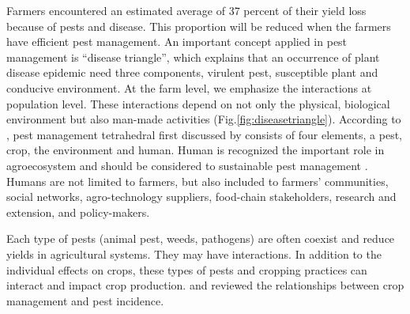 Farmers encountered an estimated average of 37 percent of their yield loss because of pests and disease. This proportion will be reduced when the farmers have efficient pest management. An important concept applied in pest management is ``disease triangle'', which explains that an occurrence of plant disease epidemic need three components, virulent pest, susceptible plant and conducive environment. At the farm level, we emphasize the interactions at population level. These interactions depend on not only the physical, biological environment but also man-made activities (Fig.\ref{fig:diseasetriangle}). According to \citet{Savary_2006_Quantification}, pest management tetrahedral first discussed by \cite{Zadoks_1979_Epidem} consists of four elements, a pest, crop, the environment and human. Human is recognized the important role in agroecosystem and should be considered to sustainable pest management \citep{Zadok_1985_Crop}. Humans are not limited to farmers, but also included to farmers' communities, social networks, agro-technology suppliers, food-chain stakeholders, research and extension, and policy-makers. 

Each type of pests (animal pest, weeds, pathogens) are  often coexist and reduce yields in agricultural systems. They may have interactions. In addition to the individual effects on crops, these types of pests and cropping practices can interact and impact crop production. \cite{Ou_1985_Rice,Ho_1994_Weed,Cohen_1998_Importance} and \cite{Mew_2004_Looking} reviewed the relationships between crop management and pest incidence. 
